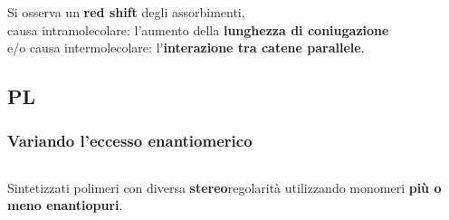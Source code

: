 \documentclass{beamer}
\begin{document}
\begin{frame}
Si osserva un \textbf{red shift} degli assorbimenti,\\ causa intramolecolare: l'aumento della \textbf{lunghezza di coniugazione} \\e/o causa intermolecolare: l'\textbf{interazione tra catene parallele}.
\end{frame}
\subsection{PL}
\begin{frame}%
\frametitle{Variando l'eccesso enantiomerico}
\begin{columns}
Sintetizzati polimeri con diversa \textbf{stereo}regolarità utilizzando monomeri \textbf{più o meno enantiopuri}.
\bigskip\bigskip


\end{columns}
\end{frame}
\end{document}

